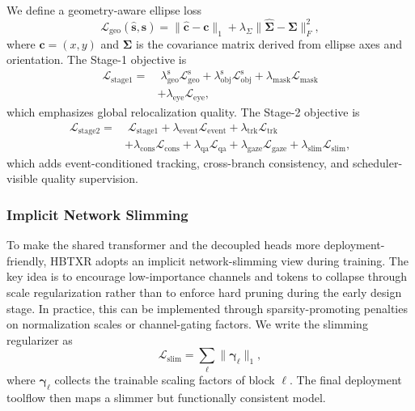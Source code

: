 \documentclass[journal]{IEEEtran}
\begin{document}
We define a geometry-aware ellipse loss
\begin{equation}
\mathcal L_{\mathrm{geo}}(\hat{\mathbf s},\mathbf s)=
\|\hat{\mathbf c}-\mathbf c\|_1 + \lambda_{\Sigma}\|\hat{\bm\Sigma}-\bm\Sigma\|_F^2,
\end{equation}
where $\mathbf c=(x,y)$ and $\bm\Sigma$ is the covariance matrix derived from ellipse axes and orientation. The Stage-1 objective is
\begin{align}
\mathcal L_{\mathrm{stage1}} =
&\;\lambda_{\mathrm{geo}}^{\mathrm{s}}\mathcal L_{\mathrm{geo}}^{\mathrm{s}}
+ \lambda_{\mathrm{obj}}^{\mathrm{s}}\mathcal L_{\mathrm{obj}}^{\mathrm{s}}
+ \lambda_{\mathrm{mask}}\mathcal L_{\mathrm{mask}}
\nonumber\\
&+ \lambda_{\mathrm{eye}}\mathcal L_{\mathrm{eye}},
\end{align}
which emphasizes global relocalization quality. The Stage-2 objective is
\begin{align}
\mathcal L_{\mathrm{stage2}} =
&\;\mathcal L_{\mathrm{stage1}}
+ \lambda_{\mathrm{event}}\mathcal L_{\mathrm{event}}
+ \lambda_{\mathrm{trk}}\mathcal L_{\mathrm{trk}}
\nonumber\\
&+ \lambda_{\mathrm{cons}}\mathcal L_{\mathrm{cons}}
+ \lambda_{\mathrm{qa}}\mathcal L_{\mathrm{qa}}
+ \lambda_{\mathrm{gaze}}\mathcal L_{\mathrm{gaze}}
+ \lambda_{\mathrm{slim}}\mathcal L_{\mathrm{slim}},
\end{align}
which adds event-conditioned tracking, cross-branch consistency, and scheduler-visible quality supervision.

\subsubsection{Implicit Network Slimming}
To make the shared transformer and the decoupled heads more deployment-friendly, HBTXR adopts an implicit network-slimming view during training. The key idea is to encourage low-importance channels and tokens to collapse through scale regularization rather than to enforce hard pruning during the early design stage. In practice, this can be implemented through sparsity-promoting penalties on normalization scales or channel-gating factors. We write the slimming regularizer as
\begin{equation}
\mathcal L_{\mathrm{slim}} = \sum_{\ell}\|\bm\gamma_{\ell}\|_1,
\end{equation}
where $\bm\gamma_{\ell}$ collects the trainable scaling factors of block $\ell$. The final deployment toolflow then maps a slimmer but functionally consistent model.
\end{document}
